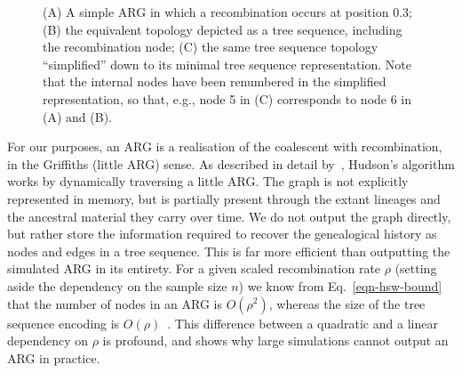 \documentclass{article}
\begin{document}
\begin{figure}
\begin{subfigure}[t]{0.33\textwidth}
\end{subfigure}
\caption{\label{fig-arg} (A) A simple ARG in which a recombination
occurs at position 0.3; (B) the equivalent topology depicted as a tree
sequence, including the recombination node; (C) the same tree sequence
topology ``simplified'' down to its minimal tree sequence representation.
Note that the internal nodes have been renumbered in the simplified
representation, so that, e.g., node 5 in (C) corresponds to node 6 in
(A) and (B).}
\end{figure}

For our purposes, an ARG is a realisation of the coalescent with
recombination, in the Griffiths (little ARG) sense.
As described in detail by~\cite{kelleher2016efficient}, Hudson's algorithm
works by dynamically traversing a little ARG.
The graph is not explicitly represented in memory, but is partially
present through the extant lineages and the ancestral material they carry
over time. We do not output the graph directly, but
rather store the information required to recover the genealogical
history as nodes and edges in a tree sequence.
This is far more efficient than outputting the simulated ARG in its entirety.
For a given scaled recombination rate $\rho$
(setting aside the dependency on the sample size $n$)
we know from Eq.~\eqref{eqn-hsw-bound} that the number of nodes
in an ARG is $O(\rho^2)$,
whereas the size of the tree sequence encoding is
$O(\rho)$~\citep{kelleher2016efficient}.
This difference between a
quadratic and a linear dependency on $\rho$ is profound, and shows why
large simulations cannot output an ARG in practice.
\end{document}
